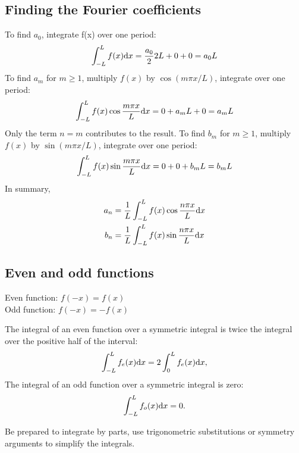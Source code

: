 \subsection*{Finding the Fourier coefficients}
To find $a_0$, integrate f(x) over one period:
\begin{equation*}
    \int_{-L}^{L}f(x) \differential x = \frac{a_0}{2}2L+0+0=a_0L
\end{equation*}
To find $a_m$ for $m \geq 1$, multiply $f(x)$ by $\cos(m \pi x / L)$, integrate over one period:
\begin{equation*}
    \int_{-L}^{L} f(x) \cos \frac{m\pi x}{L} \differential x = 0 + a_m L + 0 = a_m L
\end{equation*}
Only the term $n = m$ contributes to the result. To find $b_m$ for $m \geq 1$, multiply $f(x)$ by $\sin(m \pi x / L)$, integrate over one period:
\begin{equation*}
    \int_{-L}^{L} f(x) \sin \frac{m\pi x}{L} \differential x = 0 + 0 + b_m L = b_m L
\end{equation*}
In summary,
\begin{equation*}
    \begin{aligned}
        a_n &= \frac{1}{L} \int_{-L}^{L}f(x) \cos\frac{n \pi x}{L} \differential x \\
        b_n &= \frac{1}{L} \int_{-L}^{L}f(x) \sin\frac{n \pi x}{L} \differential x
    \end{aligned}
\end{equation*}

\subsection*{Even and odd functions}
Even function: $f(-x) = f(x)$ \\
Odd function: $f(-x) = -f(x)$
\vspace{\baselineskip}

The integral of an even function over a symmetric integral is twice the integral over the positive half of the interval:
\begin{equation*}
    \int_{-L}^{L} f_e(x) \differential x = 2 \int_{0}^{L} f_e(x) \differential x,
\end{equation*}
The integral of an odd function over a symmetric integral is zero:
\begin{equation*}
    \int_{-L}^{L} f_o(x) \differential x = 0.
\end{equation*}

Be prepared to integrate by parts, use trigonometric substitutions or symmetry arguments to simplify the integrals.

